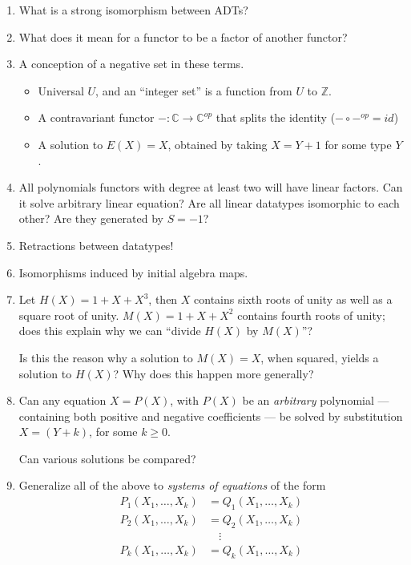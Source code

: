 \documentclass[letterpaper,numbers=enddot]{scrartcl}
\newcommand{\cat}{\mathbb{C}}
\newcommand{\op}{{op}}
\begin{document}
\begin{enumerate}
  \item What is a strong isomorphism between ADTs?
  \item What does it mean for a functor to be a factor of another functor?
  \item A conception of a negative set in these terms.
  \begin{itemize}
    \item Universal $U$, and an ``integer set'' is a function from $U$ to $\mathbb{Z}$.
    \item A contravariant functor $- : \cat \to \cat^\op$ that splits the identity
    ($- \circ -^\op = id$)
    \item A solution to $E(X)=X$, obtained by taking $X = Y + 1$ for some type $Y$.
  \end{itemize}
  \item All polynomials functors with degree at least two will have linear factors.
  Can it solve arbitrary linear equation?
  Are all linear datatypes isomorphic to each other?  Are they generated by $S = -1$?
  \item Retractions between datatypes!
  \item Isomorphisms induced by initial algebra maps.
  \item Let $H(X) = 1 + X + X^3$, then $X$ contains sixth roots of unity as well as
  a square root of unity.  $M(X) = 1 + X + X^2$ contains fourth roots of unity;
  does this explain why we can ``divide $H(X)$ by $M(X)$''?

  Is this the reason why a solution to $M(X)=X$, when squared, yields a solution to $H(X)$?
  Why does this happen more generally?
  \item Can any equation $X=P(X)$, with $P(X)$ be an \emph{arbitrary}
  polynomial --- containing both positive and negative coefficients ---
  be solved by substitution $X = (Y+k)$, for some $k \ge 0$.

  Can various solutions be compared?

  \item Generalize all of the above to \emph{systems of equations} of the form
  \begin{align*}
    P_1(X_1,\dots,X_k) &= Q_1(X_1,\dots,X_k)\\
    P_2(X_1,\dots,X_k) &= Q_2(X_1,\dots,X_k)\\
     &\quad \vdots \\
    P_k(X_1,\dots,X_k) &= Q_k(X_1,\dots,X_k)
  \end{align*}
\end{enumerate}
\end{document}

